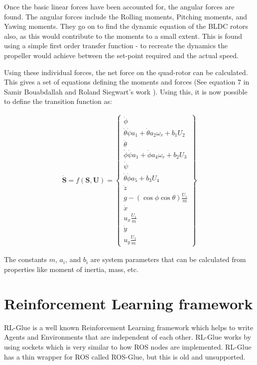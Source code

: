 \documentclass[hidelinks,BTech]{iitmdiss}
\begin{document}
Once the basic linear forces have been accounted for, the angular forces are found. The angular forces include the Rolling moments, Pitching moments, and Yawing moments. They go on to find the dynamic equation of the BLDC rotors also, as this would contribute to the moments to a small extent. This is found using a simple first order transfer function - to recreate the dynamics the propeller would achieve between the set-point required and the actual speed.

Using these individual forces, the net force on the quad-rotor can be calculated. This gives a set of equations defining the moments and forces (See equation 7 in Samir Bouabdallah and Roland Siegwart's work \cite{QuadrotorDynamics}). Using this, it is now possible to define the transition function as:

\begin{equation} \begin{split}
  \dot{\mathbf{S}} = f(\mathbf{S}, \mathbf{U}) = \left\{
    \begin{array}{c}
      \dot{\phi} \\
      \dot{\theta} \dot{\psi} a_{1} + \dot{\theta} a_{2} \omega_{r} + b_{1} U_{2} \\
      \dot{\theta} \\
      \dot{\phi} \dot{\psi} a_{1} + \dot{\phi} a_{4} \omega_{r} + b_{2} U_{3} \\
      \dot{\psi} \\
      \dot{\theta} \dot{\phi} a_{5} + b_{3} U_{4} \\
      \dot{z} \\
      g  - (\cos{\phi} \cos{\theta})\frac{U_{1}}{m} \\
      \dot{x} \\
      u_{x} \frac{U_{1}}{m} \\
      \dot{y} \\
      u_{y} \frac{U_{1}}{m}
    \end{array}
  \right\}
\end{split} \end{equation}

The constants $m$, $a_{i}$, and $b_{i}$ are system parameters that can be calculated from properties like moment of inertia, mass, etc.

\section{Reinforcement Learning framework}

RL-Glue \cite{RLGlue} is a well known Reinforcement Learning framework which helps to write Agents and Environments that are independent of each other. RL-Glue works by using sockets which is very similar to how ROS nodes are implemented. RL-Glue has a thin wrapper for ROS called ROS-Glue, but this is old and unsupported.
\end{document}
